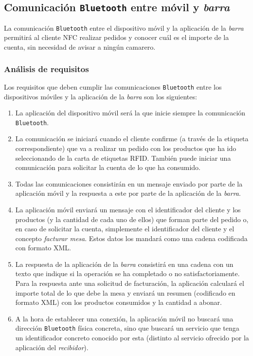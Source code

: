 \subsection{Comunicación \texttt{Bluetooth} entre móvil y \emph{barra}}
\label{subsec:mobile-bar}
La comunicación \texttt{Bluetooth} entre el dispositivo móvil y la aplicación
de la \emph{barra} permitirá al cliente \acs{NFC} realizar pedidos y conocer
cuál es el importe de la cuenta, sin necesidad de avisar a ningún camarero.

\subsubsection{Análisis de requisitos}
Los requisitos que deben cumplir las comunicaciones \texttt{Bluetooth} entre
los dispositivos móviles y la aplicación de la \emph{barra} son los
siguientes:
\begin{enumerate}
\item La aplicación del dispositivo móvil será la que inicie siempre la
comunicación \texttt{Bluetooth}.
\item La comunicación se iniciará cuando el cliente confirme (a través de la
etiqueta correspondiente) que va a realizar un pedido con los productos que ha 
ido seleccionando de la carta de etiquetas \acs{RFID}. También puede iniciar
una comunicación para solicitar la cuenta de lo que ha consumido.
\item Todas las comunicaciones consistirán en un mensaje enviado por parte de
la aplicación móvil y la respuesta a este por parte de la aplicación de la
\emph{barra}.
\item La aplicación móvil enviará un mensaje con el identificador del cliente
y los productos (y la cantidad de cada uno de ellos) que forman parte del
pedido o, en caso de solicitar la cuenta, simplemente el identificador del
cliente y el concepto \emph{facturar mesa}. Estos datos los mandará como una
cadena codificada con formato \acs{XML}.
\item La respuesta de la aplicación de la \emph{barra} consistirá en una cadena 
con un texto que indique si la operación se ha completado o no 
satisfactoriamente.
Para la respuesta ante una solicitud de facturación, la aplicación calculará
el importe total de lo que debe la mesa y enviará un resumen (codificado
en formato \acs{XML}) con los productos consumidos y la cantidad a abonar.
\item A la hora de establecer una conexión, la aplicación móvil no buscará una
dirección \texttt{Bluetooth} física concreta, sino que buscará un servicio que
tenga un identificador concreto conocido por esta (distinto al servicio
ofrecido por la aplicación del \emph{recibidor}).
\end{enumerate}

